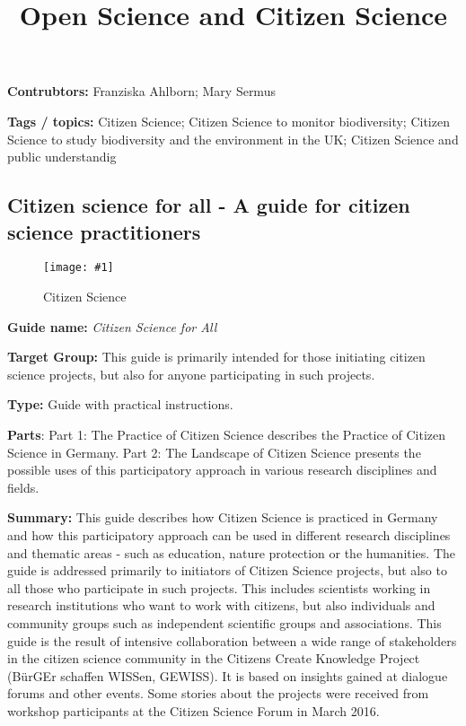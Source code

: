 \documentclass{article}
\newlength{\imgwidth}
\newcommand\scaledgraphics[2]{%
                
\settowidth{\imgwidth}{\texttt{[image: \#1]}}%
                
\setlength{\imgwidth}{\minof{\imgwidth}{#2\textwidth}}%
                
\texttt{[image: \#1]}%
                
}
\begin{document}
\title{Open Science and Citizen Science}

\maketitle


\textbf{Contrubtors:} Franziska Ahlborn; Mary Sermus


\textbf{Tags / topics:} Citizen Science; Citizen Science to monitor biodiversity; Citizen Science to study biodiversity and the environment in the UK; Citizen Science and public understandig


\subsection{Citizen science for all - A guide for citizen science practitioners}\label{H2662301}



\begin{center}
\begin{figure}
\scaledgraphics{3cbbd8ed-7495-46a8-8cb5-114cf95cfb83.png}{0.75}
\caption*{Citizen Science}\label{F38618731}
\end{figure}


\end{center}


\textbf{Guide name:} \emph{Citizen Science for All} \autocite{noauthor_citizen_2016}


\textbf{Target Group: }This guide is primarily intended for those initiating citizen science projects, but also for anyone participating in such projects.


\textbf{Type: }Guide with practical instructions.


\textbf{Parts}:  Part 1: The Practice of Citizen Science describes the Practice of Citizen Science in Germany. Part 2: The Landscape of Citizen Science presents the possible uses of this participatory approach in various research disciplines and fields.


\textbf{Summary: }This guide describes how Citizen Science is practiced in Germany and how this participatory approach can be used in different research disciplines and thematic areas - such as education, nature protection or the humanities. The guide is addressed primarily to initiators of Citizen Science projects, but also to all those who participate in such projects. This includes scientists working in research institutions who want to work with citizens, but also individuals and community groups such as independent scientific groups and associations. This guide is the result of intensive collaboration between a wide range of stakeholders in the citizen science community in the Citizens Create Knowledge Project (BürGEr schaffen WISSen, GEWISS). It is based on insights gained at dialogue forums and other events. Some stories about the projects were received from workshop participants at the Citizen Science Forum in March 2016.
\end{document}
